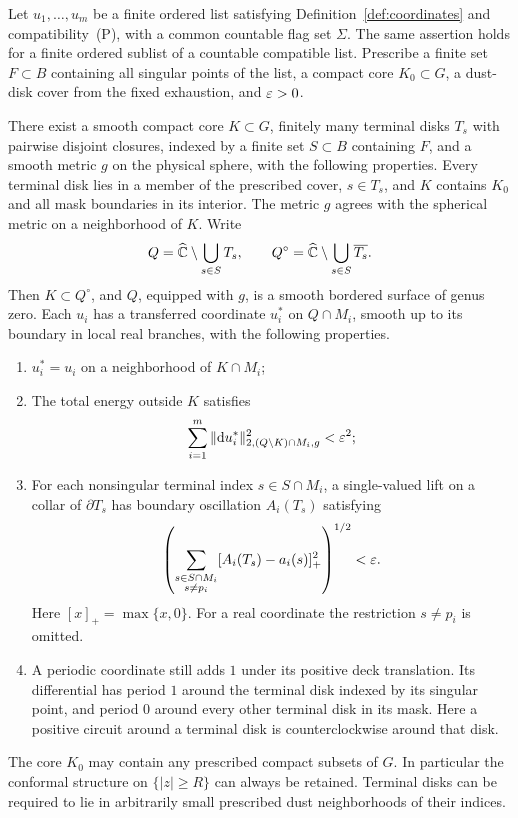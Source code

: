 \begin{theorem}\label{thm:transfer}
Let $u_1,\ldots,u_m$ be a finite ordered list satisfying
Definition~\ref{def:coordinates} and compatibility~(P), with a common
countable flag set $\Sigma$.  The same assertion holds for a finite
ordered sublist of a countable compatible list.  Prescribe a finite set
$F\subset B$ containing all singular points of the list, a compact core
$K_0\subset G$, a dust-disk cover from the fixed exhaustion, and
$\varepsilon>0$.

There exist a smooth compact core $K\subset G$, finitely many
terminal disks $T_s$ with pairwise disjoint closures, indexed by a finite set
$S\subset B$ containing $F$, and a smooth metric $g$ on the physical
sphere, with the following properties.  Every terminal disk lies in a
member of the prescribed cover, $s\in T_s$, and $K$ contains $K_0$ and
all mask boundaries in its interior.  The metric $g$ agrees with the
spherical metric on a neighborhood of $K$.  Write
\[
 Q=\widehat{\mathbb C}\setminus\bigcup_{s\in S}T_s,
 \qquad Q^\circ=\widehat{\mathbb C}\setminus\bigcup_{s\in S}\overline{T_s}.
\]
Then $K\subset Q^\circ$, and $Q$, equipped with $g$, is a smooth
bordered surface of genus zero.
Each $u_i$ has a transferred coordinate $u_i^*$ on $Q\cap M_i$, smooth
up to its boundary in local real branches, with the following properties.
\begin{enumerate}[label=\textup{(\roman*)}]
\item $u_i^*=u_i$ on a neighborhood of $K\cap M_i$;
\item The total energy outside $K$ satisfies
\begin{equation}\label{eq:transfer-tail}
 \sum_{i=1}^m
 \|\mathrm d u_i^*\|_{2,(Q\setminus K)\cap M_i,g}^2<\varepsilon^2;
\end{equation}
\item For each nonsingular terminal index $s\in S\cap M_i$, a
single-valued lift on a collar of $\partial T_s$ has boundary oscillation
$A_i(T_s)$ satisfying
\begin{equation}\label{eq:transfer-oscillation}
 \left(\sum_{\substack{s\in S\cap M_i\\s\ne p_i}}
       [A_i(T_s)-a_i(s)]_+^2\right)^{1/2}<\varepsilon.
\end{equation}
Here $[x]_+=\max\{x,0\}$.  For a real coordinate the restriction
$s\ne p_i$ is omitted.
\item A periodic coordinate still adds $1$ under its positive deck
translation.  Its differential has period $1$ around the terminal disk
indexed by its singular point, and period $0$ around every other
terminal disk in its mask.  Here a positive circuit around a terminal
disk is counterclockwise around that disk.
\end{enumerate}
The core $K_0$ may contain any prescribed compact subsets of $G$.
In particular the conformal structure on $\{|z|\ge R\}$ can always be
retained.  Terminal disks can be required to lie in arbitrarily small
prescribed dust neighborhoods of their indices.
\end{theorem}

